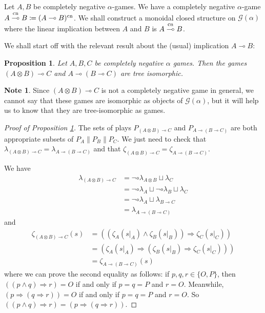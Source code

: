 \documentclass[11pt]{article} %
\theoremstyle{plain} %
\newtheorem{proposition}[theorem]{Proposition}
\theoremstyle{definition} %
\theoremstyle{note}
\newtheorem{note}[theorem]{Note}
\theoremstyle{exercisestyle}
\newcommand{\tensor}{\otimes}
\renewcommand{\implies}{\multimap}
\newcommand{\cprd}{\sqcup}
\newcommand{\G}{\mathcal G}
\newcommand{\OP}{\{O,P\}}
\DeclareMathOperator{\cn}{cn}
\newcommand{\impliescn}{\protect\overset{\cn}{\implies}}
\begin{document}
Let $A,B$ be completely negative $\alpha$-games.  We have a completely negative $\alpha$-game $A\impliescn B\coloneqq (A\implies B)^{\cn}$.  We shall construct a monoidal closed structure on $\G(\alpha)$ where the linear implication between $A$ and $B$ is $A\impliescn B$.  

We shall start off with the relevant result about the (usual) implication $A\implies B$:

\begin{proposition}
  \label{impliesTreeIsom}
  Let $A,B,C$ be completely negative $\alpha$ games.  Then the games $(A\tensor B)\implies C$ and $A\implies(B\implies C)$ are tree isomorphic.
\end{proposition}

\begin{note}
  Since $(A\tensor B)\implies C$ is not a completely negative game in general, we cannot say that these games are isomorphic as objects of $\G(\alpha)$, but it will help us to know that they are tree-isomorphic as games.
\end{note}

\begin{proof}[Proof of Proposition \ref{impliesTreeIsom}]
  The sets of plays $P_{(A\tensor B)\implies C}$ and $P_{A\implies(B\implies C)}$ are both appropriate subsets of $P_A\|P_B\|P_C$.  We just need to check that $\lambda_{(A\tensor B)\implies C}=\lambda_{A\implies(B\implies C)}$ and that $\zeta_{(A\tensor B)\implies C}=\zeta_{A\implies(B\implies C)}$.  

  We have
  \begin{align*}
    \lambda_{(A\tensor B)\implies C} &= \neg\circ\lambda_{A\tensor B}\cprd\lambda_C\\
    &= \neg\circ\lambda_A\cprd\neg\circ\lambda_B\cprd\lambda_C\\
    &= \neg\circ\lambda_A\cprd\lambda_{B\implies C}\\
    &= \lambda_{A\implies(B\implies C)}
  \end{align*}
  and
  \begin{align*}
    \zeta_{(A\tensor B)\implies C}(s) & = ((\zeta_A(s\vert_A)\wedge\zeta_B(s\vert_B))\Rightarrow\zeta_C(s\vert_C))\\
    &=(\zeta_A(s\vert_A)\Rightarrow(\zeta_B(s\vert_B)\Rightarrow\zeta_C(s\vert_C))) \\
    &=\zeta_{A\implies(B\implies C)}(s)
  \end{align*}
  where we can prove the second equality as follows: if $p,q,r\in\OP$, then $((p\wedge q)\Rightarrow r) = O$ if and only if $p=q=P$ and $r=O$.  Meanwhile, $(p\Rightarrow (q\Rightarrow r))=O$ if and only if $p=q=P$ and $r=O$.  So $((p\wedge q)\Rightarrow r) = (p\Rightarrow(q\Rightarrow r))$.
\end{proof}
\end{document}
